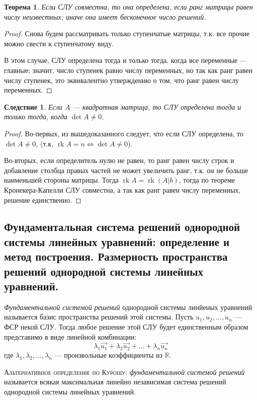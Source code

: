 \documentclass[a4paper, 12pt]{article}
\DeclareMathOperator{\rk}{rk}
\newtheorem*{theorem}{Теорема}
\newtheorem*{follows}{Следствие}
\begin{document}
\begin{theorem}
    Если СЛУ совместна, то она определена, если ранг матрицы равен числу неизвестных; иначе она имеет бесконечное число решений.
\end{theorem}
\begin{proof}
    Снова будем рассматривать только ступенчатые матрицы, т.к. все прочие можно свести к ступенчатому виду.

    В этом случае, СЛУ определена тогда и только тогда, когда все переменные --- главные; значит, число ступенек равно числу переменных, но так как ранг равен числу ступенек, это эквивалентно утверждению о том, что ранг равен числу переменных.
\end{proof}
\begin{follows}
    Если $A$ --- квадратная матрица, то СЛУ определена тогда и только тогда, когда $\det A \neq 0$.
\end{follows}
\begin{proof}
    Во-первых, из вышедоказанного следует, что если СЛУ определена, то $\det A \neq 0$, (т.к. $\rk A = n \iff \det A \neq 0$).
    
    Во-вторых, если определитель нулю не равен, то ранг равен числу строк и добавление столбца правых частей не может увеличить ранг, т.к. он не больше наименьшей стороны матрицы. Тогда $\rk A = \rk(A|b)$, тогда по теореме Кронекера-Капелли СЛУ совместна, а так как ранг равен числу переменных, решение единственно.
\end{proof}

\subsection{Фундаментальная система решений однородной системы линейных уравнений: определение и метод построения. Размерность пространства решений однородной системы линейных уравнений.}
\textit{Фундаментальной системой решений} однородной системы линйеных уравнений называется базис пространства решений этой системы. Пусть $u_1, u_2, \ldots , u_n$ --- ФСР некой СЛУ. Тогда любое решение этой СЛУ будет единственным образом представимо в виде линейной комбинации:
\[
\lambda_1\vec{u_1} + \lambda_2\vec{u_2} + \ldots + \lambda_n\vec{u_n}
\]
где $\lambda_1, \lambda_2, \ldots ,\lambda_n$ --- произвольные коэффициенты из $\mathbb{R}$.

\textsc{Альтернативное определение по Курошу:} \textit{фундаментальной системой решений} называется всякая максимальная линейно независимая система решений однородной системы линейных уравнений.
\end{document}
